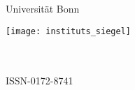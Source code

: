 %
%
%
{\thispagestyle{empty}
  \addtolength{\oddsidemargin}{1.0cm}\addtolength{\topmargin}{1.0cm}
  \rmfamily\setlength{\parindent}{0pt}
  \begin{center}
    {\fontsize{44}{50}\selectfont
      Universität Bonn}

    \vspace*{20pt}

    \begin{singlespace}
      \fontsize{30}{40}\selectfont
      \InstituteName
    \end{singlespace}

    \vspace*{40pt}

    \begin{onehalfspace}
      \bfseries\huge
      \thesistitle
    \end{onehalfspace}

    \vspace*{20pt}

    {\LARGE
      \thesisauthor
    }
  \end{center}

  \vspace*{\fill}

  \thesisabstract

  \vspace*{\fill}

  {\normalfont\normalsize
    \parbox{0.3\textwidth}{\InstituteAddress}
    \parbox{0.4\textwidth}{%
      \centering
      \texttt{[image: instituts\_siegel]}
    }
    \parbox{0.29\textwidth}{%
      \thesisnumber\\
      \thesismonth{} \thesisyear\\
      ISSN-0172-8741
    }
  }
}
